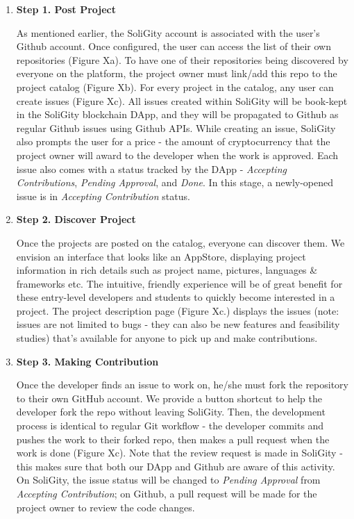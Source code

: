 \documentclass[12pt]{article}
\renewcommand{\_}{\kern-1.5pt\textunderscore\kern-1.5pt}
\begin{document}
\begin{enumerate}
\begin{enumerate}
		      \item \textbf{Step 1. Post Project}\par
                
                As mentioned earlier, the SoliGity account is associated with the user’s Github account. Once configured, the user can access the list of their own repositories (Figure Xa). To have one of their repositories being discovered by everyone on the platform, the project owner must link/add this repo to the project catalog (Figure Xb). For every project in the catalog, any user can create issues (Figure Xc). All issues created within SoliGity will be book-kept in the SoliGity blockchain DApp, and they will be propagated to Github as regular Github issues using Github APIs. While creating an issue, SoliGity also prompts the user for a price - the amount of cryptocurrency that the project owner will award to the developer when the work is approved. Each issue also comes with a status tracked by the DApp - \textit{Accepting Contributions}, \textit{Pending Approval}, and \textit{Done}. In this stage, a newly-opened issue is in \textit{Accepting Contribution} status. \par
                
		      \item \textbf{Step 2. Discover Project}\par
		      Once the projects are posted on the catalog, everyone can discover them. We envision an interface that looks like an AppStore, displaying project information in rich details such as project name, pictures, languages & frameworks etc. The intuitive, friendly experience will be of great benefit for these entry-level developers and students to quickly become interested in a project. The project description page (Figure Xc.) displays the issues (note: issues are not limited to bugs - they can also be new features and feasibility studies) that’s available for anyone to pick up and make contributions. 

		           
		     \item \textbf{Step 3. Making Contribution}\par
		     Once the developer finds an issue to work on, he/she must fork the repository to their own GitHub account. We provide a button shortcut to help the developer fork the repo without leaving SoliGity. Then, the development process is identical to regular Git workflow - the developer commits and pushes the work to their forked repo, then makes a pull request when the work is done (Figure Xc). Note that the review request is made in SoliGity - this makes sure that both our DApp and Github are aware of this activity. On SoliGity, the issue status will be changed to \textit{Pending Approval} from \textit{Accepting Contribution}; on Github, a pull request will be made for the project owner to review the code changes. \par
		     

\end{enumerate}
\end{enumerate}
\end{document}
